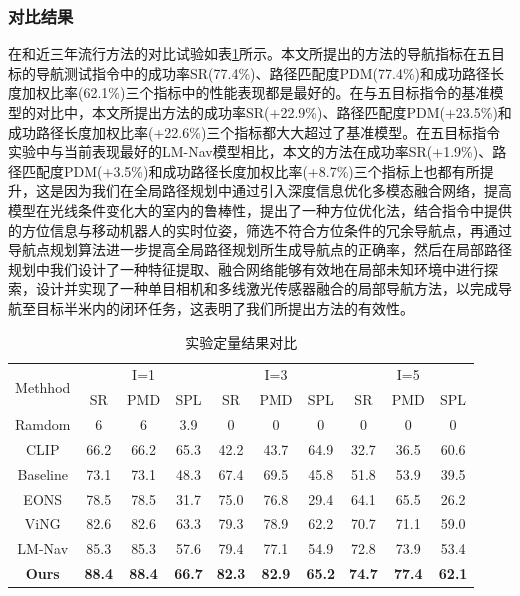 \subsubsection{对比结果}
在和近三年流行方法的对比试验如表\ref{cmpresult}所示。本文所提出的方法的导航指标在五目标的导航测试指令中的成功率SR(77.4\%)、路径匹配度PDM(77.4\%)和成功路径长度加权比率(62.1\%)三个指标中的性能表现都是最好的。在与五目标指令的基准模型的对比中，本文所提出方法的成功率SR(+22.9\%)、路径匹配度PDM(+23.5\%)和成功路径长度加权比率(+22.6\%)三个指标都大大超过了基准模型。在五目标指令实验中与当前表现最好的LM-Nav模型相比，本文的方法在成功率SR(+1.9\%)、路径匹配度PDM(+3.5\%)和成功路径长度加权比率(+8.7\%)三个指标上也都有所提升，这是因为我们在全局路径规划中通过引入深度信息优化多模态融合网络，提高模型在光线条件变化大的室内的鲁棒性，提出了一种方位优化法，结合指令中提供的方位信息与移动机器人的实时位姿，筛选不符合方位条件的冗余导航点，再通过导航点规划算法进一步提高全局路径规划所生成导航点的正确率，然后在局部路径规划中我们设计了一种特征提取、融合网络能够有效地在局部未知环境中进行探索，设计并实现了一种单目相机和多线激光传感器融合的局部导航方法，以完成导航至目标半米内的闭环任务，这表明了我们所提出方法的有效性。
\begin{table}[]
\caption{\label{cmpresult}实验定量结果对比}
\centering
    \begin{tabular}{c|ccc|ccc|ccc}
    \hline
    \multirow{2}{*}{Methhod} & \multicolumn{3}{c|}{I=1} & \multicolumn{3}{c|}{I=3} & \multicolumn{3}{c}{I=5}                 \\ \cline{2-10} 
                             & SR     & PMD    & SPL    & SR     & PMD    & SPL    & SR   & PMD  & SPL                       \\ \hline
    Ramdom                   & 6      & 6      & 3.9    & 0      & 0      & 0      & 0    & 0    & 0                         \\
    CLIP                     & 66.2   & 66.2   & 65.3   & 42.2   & 43.7   & 64.9   & 32.7 & 36.5 & 60.6                      \\
    Baseline                 & 73.1   & 73.1   & 48.3   & 67.4   & 69.5   & 45.8   & 51.8 & 53.9 & 39.5                      \\
    EONS                     & 78.5   & 78.5   & 31.7   & 75.0   & 76.8   & 29.4   & 64.1 & 65.5 & 26.2                      \\
    ViNG                     & 82.6   & 82.6   & 63.3   & 79.3   & 78.9   & 62.2   & 70.7 & 71.1 & 59.0                      \\
    LM-Nav                   & 85.3   & 85.3   & 57.6   & 79.4   & 77.1   & 54.9   & 72.8 & 73.9 & 53.4                      \\ \hline
    \textbf{Ours}            & \textbf{88.4}   & \textbf{88.4}   & \textbf{66.7}   & \textbf{82.3}   & \textbf{82.9}   & \textbf{65.2}   & \textbf{74.7} & \textbf{77.4} & \textbf{62.1} \\ \hline
    \end{tabular}
    \label{cmpresult}
    \end{table}


